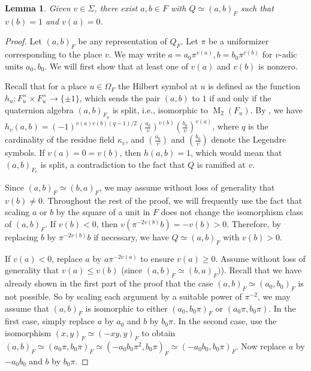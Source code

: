 \documentclass[11pt,letterpaper]{amsart}
\theoremstyle{plain}
\newtheorem{lemma}[theorem]{Lemma}
\theoremstyle{definition}
\theoremstyle{remark}
\begin{document}
\begin{lemma}\label{ab-vals}
    Given $v\in \Sigma$, there exist $a,b\in F$ with $Q\simeq (a,b)_F$ such that $v(b)=1$ and $v(a)=0$. 
\end{lemma}
\begin{proof}
    Let $(a,b)_F$ be any representation of $Q_F$. Let $\pi$ be a uniformizer corresponding to the place $v$. We may write $a = a_0\pi^{v(a)}, b= b_0\pi^{v(b)}$ for $v$-adic units $a_0,b_0$.
    We will first show that at least one of $v(a)$ and $v(b)$ is nonzero.
    
     Recall that for a place $u\in\Omega_F$ the Hilbert symbol at $u$ is defined as the function $h_u\colon F_u^\times\times F_u^\times\to \{\pm 1\}$, which sends the pair $(a,b)$ to $1$ if and only if the quaternion algebra $(a,b)_{F_u}$ is split, i.e., isomorphic to $\operatorname{M}_2(F_u)$.
     By \cite[12.4.8]{voight2021quaternion}, we have $h_v(a,b) = (-1)^{v(a)v(b)(q-1)/2}\left(\frac{a_0}{v}\right)^{v(b)}\left(\frac{b_0}{v}\right)^{v(a)}$, where $q$ is the cardinality of the residue field $\kappa_v$, and $\left(\frac{a_0}{v}\right)$ and $\left(\frac{b_0}{v}\right)$ denote the Legendre symbols. If $v(a) = 0 = v(b)$, then $h(a,b) = 1$, which would mean that $(a,b)_{F_v}$ is split, a contradiction to the fact that $Q$ is ramified at $v$.

    Since $(a,b)_F\simeq (b,a)_F$, we may assume without loss of generality that $v(b)\neq 0$. Throughout the rest of the proof, we will frequently use the fact that scaling $a$ or $b$ by the square of a unit in $F$ does not change the isomorphism class of $(a,b)_F$.
    If $v(b)<0$, then $v(\pi^{-2v(b)}b) = -v(b)>0$. Therefore, by replacing $b$ by $\pi^{-2v(b)}b$ if necessary, we have $Q\simeq (a,b)_F$ with $v(b)>0$.

    If $v(a)<0$, replace $a$ by $a\pi^{-2v(a)}$ to ensure $v(a)\geq 0$. Assume without loss of generality that $v(a)\leq v(b)$ (since $(a,b)_F\simeq (b,a)_F)$). Recall that we have already shown in the first part of the proof that the case $(a,b)_F\simeq (a_0,b_0)_F$ is not possible. So by scaling each argument by a suitable power of $\pi^{-2}$, we may assume that $(a,b)_F$ is isomorphic to either $(a_0,b_0\pi)_F$ or $(a_0\pi,b_0\pi)$.  In the first case, simply replace $a$ by $a_0$ and $b$ by $b_0\pi$. In the second case, use the isomorphism $(x,y)_F\simeq (-xy,y)_F$ to obtain $(a,b)_F\simeq (a_0\pi,b_0\pi)_F\simeq (-a_0b_0\pi^2,b_0\pi)_F\simeq (-a_0b_0,b_0\pi)_F$. Now replace $a$ by $-a_0b_0$ and $b$ by $b_0\pi$.
\end{proof}
\end{document}
